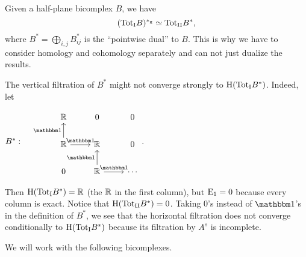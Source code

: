 \documentclass[\MainFolder/Text.tex]{subfiles}
\begin{document}
\begin{Remark}\label{Rem:SpecSeq}
\begin{RemarkList}
\item Given a half-plane bicomplex $B$, we have
$$ ({\mathrm{Tot}_{\mathrm{I}}} B)^{*_{\mathrm{g}}} \simeq {\mathrm{Tot}_{\mathrm{II}}} B^*, $$
where $B^* = \bigoplus_{i,j} B_{ij}^*$ is the ``pointwise dual'' to $B$. This is why we have to consider homology and cohomology separately and can not just dualize the results.
\item The vertical filtration of $B^*$ might not converge strongly to $\mathrm{H}({\mathrm{Tot}_{\mathrm{I}}} B^*)$. Indeed, let
\begin{center}
$B^*: \quad \begin{tikzcd}
 \R & 0 & 0  \\
 \R\arrow{u}{\Id}\arrow{r}{\Id} & \R & 0   \\
 0 & \R\arrow{u}{\Id}\arrow{r}{\Id} & \dotsb
\end{tikzcd}$.
\end{center}
Then $\mathrm{H}({\mathrm{Tot}_{\mathrm{I}}} B^*) = \mathbb{R}$ (the $\mathbb{R}$ in the first column), but $\mathrm{E}_1 = 0$ because every column is exact. Notice that $\mathrm{H}({\mathrm{Tot}_{\mathrm{II}}} B^*) = 0$. Taking $0$'s instead of $\Id$'s in the definition of $B^*$, we see that the horizontal filtration does not converge conditionally to $\mathrm{H}({\mathrm{Tot}_{\mathrm{I}}} B^*)$ because its filtration by $A^s$ is incomplete.
\qedhere
\end{RemarkList}
\end{Remark}

We will work with the following bicomplexes.
\end{document}
